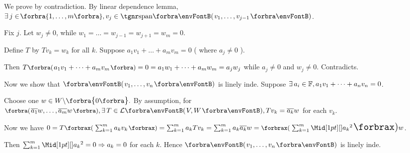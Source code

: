 \documentclass[a4paper, 11pt, UTF8]{article}
\begin{document}
\begin{large}
\par\quad
We prove by contradiction. By linear dependence lemma, $\exists\,j\in\!\Bra{1,\dots,m},v_j\in\Span{v_1,\dots,v_{j-1}}$.\par\quad
Fix $j$. Let $w_j\neq 0$, while $w_1=\dots=w_{j-1}=w_{j+1}=w_m=0.$\par\quad
Define $T$ by $Tv_k=w_k$ for all $k$. Suppose $a_1 v_1+\dots+a_m v_m=0$ ( where $a_j\neq 0$ ).\par\quad
Then $T\BigPar{a_1 v_1+\dots+a_m v_m}=0=a_1 w_1+\dots+a_m w_m=a_j w_j$ while $a_j\neq 0$ and $w_j\neq 0.$ Contradicts.\PfEnd\vspace{6pt}\quad
\Or {}\par\quad
{Now we show that $\Par{v_1,\dots,v_n}$ is linely inde. Suppose {$\exists\,a_i\in{\mathbb{F}},a_1 v_1+\dots+a_n v_n=0$}.}\vspace{2pt}\par\quad
{Choose one $w\in W\backslash\envFontDefault\zeroSubs.$ By assumption, for {$\BigPar{\overline{a_1}w,\dots,\overline{a_m}w},\exists\,T\in\Lm{V,W},Tv_k=\overline{a_k}w$} for each $v_k$.}\vspace{2pt}\par\quad
{Now we have {$ 0=T\XPar{\sum_{k=1}^m a_k v_k}=\sum_{k=1}^m a_k Tv_k=\sum_{k=1}^m a_k\overline{a_k}w=\XPar{\sum_{k=1}^m \aMid{a_k}{^2}}w$}.}\par\quad
{Then {$\sum_{k=1}^m\aMid{a_k}{^2}=0\Rightarrow a_k=0$} for each $k.$ Hence $\Par{v_1,\dots,v_n}$ is linely inde.}\PfEnd
\SepLine


\end{large}
\end{document}
